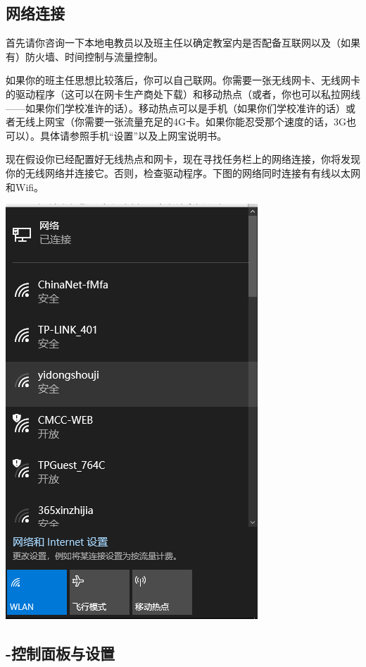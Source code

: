 \subsection{网络连接}
首先请你咨询一下本地电教员以及班主任以确定教室内是否配备互联网以及（如果有）防火墙、时间控制与流量控制。\par
如果你的班主任思想比较落后，你可以自己联网。你需要一张无线网卡、无线网卡的驱动程序（这可以在网卡生产商处下载）和移动热点（或者，你也可以私拉网线——如果你们学校准许的话）。移动热点可以是手机（如果你们学校准许的话）或者无线上网宝（你需要一张流量充足的4G卡。如果你能忍受那个速度的话，3G也可以）。具体请参照手机“设置”以及上网宝说明书。\par
现在假设你已经配置好无线热点和网卡，现在寻找任务栏上的网络连接，你将发现你的无线网络并连接它。否则，检查驱动程序。下图的网络同时连接有有线以太网和Wifi。
\begin{center}
	\includegraphics[scale=0.4]{pic/wifi}
\end{center} 
\subsection{-控制面板与设置}
